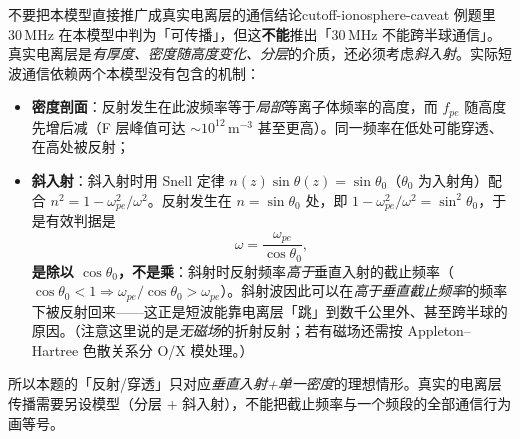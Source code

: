 \begin{warning}{不要把本模型直接推广成真实电离层的通信结论}{cutoff-ionosphere-caveat}
例题里 $30\,\mathrm{MHz}$ 在本模型中判为「可传播」，但这\textbf{不能}推出「$30\,\mathrm{MHz}$ 不能跨半球通信」。真实电离层是\emph{有厚度、密度随高度变化、分层}的介质，还必须考虑\emph{斜入射}。实际短波通信依赖两个本模型没有包含的机制：
\begin{itemize}
\item \textbf{密度剖面}：反射发生在此波频率等于\emph{局部}等离子体频率的高度，而 $f_{pe}$ 随高度先增后减（F 层峰值可达 $\sim10^{12}\,\mathrm{m^{-3}}$ 甚至更高）。同一频率在低处可能穿透、在高处被反射；
\item \textbf{斜入射}：斜入射时用 Snell 定律 $n(z)\sin\theta(z)=\sin\theta_0$（$\theta_0$ 为入射角）配合 $n^2=1-\omega_{pe}^2/\omega^2$。反射发生在 $n=\sin\theta_0$ 处，即 $1-\omega_{pe}^2/\omega^2=\sin^2\theta_0$，于是有效判据是
\[
\omega=\frac{\omega_{pe}}{\cos\theta_0},
\]
\textbf{是除以 $\cos\theta_0$，不是乘}：斜射时反射频率\emph{高于}垂直入射的截止频率（$\cos\theta_0<1\Rightarrow\omega_{pe}/\cos\theta_0>\omega_{pe}$）。斜射波因此可以在\emph{高于垂直截止频率}的频率下被反射回来——这正是短波能靠电离层「跳」到数千公里外、甚至跨半球的原因。（注意这里说的是\emph{无磁场}的折射反射；若有磁场还需按 Appleton--Hartree 色散关系分 O/X 模处理。）
\end{itemize}
所以本题的「反射/穿透」只对应\emph{垂直入射+单一密度}的理想情形。真实的电离层传播需要另设模型（分层 + 斜入射），不能把截止频率与一个频段的全部通信行为画等号。
\end{warning}


